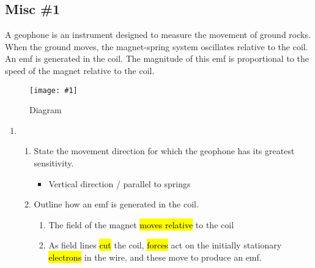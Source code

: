 \documentclass[a4paper,12pt]{article}
\newcommand{\img}[4]{\begin{center}
  \begin{figure}[H]
    \centering
    \texttt{[image: \#1]}
    \caption{#3}
    \label{fig:#4}
  \end{figure}
\end{center}}
\begin{document}
\pagebreak

\subsection{Misc \#1}

A geophone is an instrument designed to measure the movement of ground rocks. When the ground moves, the magnet-spring system oscillates relative to the coil.
An emf is generated in the coil. The magnitude of this emf is proportional to the speed of the magnet relative to the coil.

\img{ex/1.png}{0.45}{Diagram}{geophone}

\begin{enumerate}[label=(\alph*)]
  \item \begin{enumerate}[label=(\roman*)]
          \item State the movement direction for which the geophone has its greatest sensitivity.
                \begin{itemize}
                  \item Vertical direction / parallel to springs
                \end{itemize}
          \item Outline how an emf is generated in the coil.
                \begin{enumerate}
                  \item The field of the magnet \hl{moves relative} to the coil
                  \item As field lines \hl{cut} the coil, \hl{forces} act on the initially stationary \hl{electrons} in the wire, and these move to produce an emf.


\end{enumerate}
\end{enumerate}
\end{enumerate}
\end{document}
